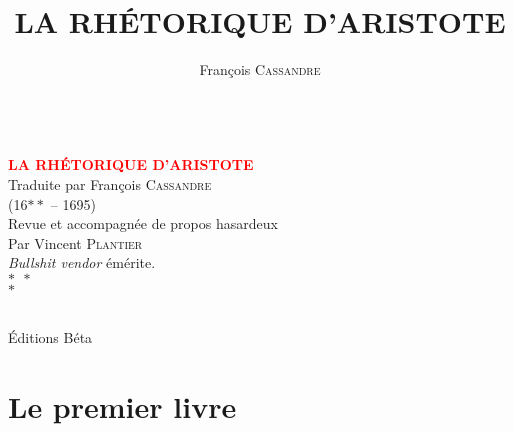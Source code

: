 \documentclass[11pt]{book}
\title{LA RHÉTORIQUE D'ARISTOTE}
\author{François \textsc{Cassandre}}
\begin{document}
\begin{titlepage}

	\centering
	
	~\\[\baselineskip] 

	\textcolor{Red}{\textbf{\Huge LA RHÉTORIQUE D'ARISTOTE}}\\[1.6\baselineskip] 
	
	{\LARGE Traduite par François \textsc{Cassandre}}\\{\small(16$**$ -- 1695)}\\[2.6\baselineskip]
	
	Revue et accompagnée de propos hasardeux\\[0.6\baselineskip] 
	
	\Large Par Vincent P\textsc{lantier}\\[0.6\baselineskip]
	
	{	\footnotesize \emph{Bullshit vendor} émérite.\\$*~~*$\\$*$\\
	}

	\vfill 
	
	\\[0.5\baselineskip]
	
	Éditions Béta

\end{titlepage}


\renewcommand{\headrulewidth}{0pt}




\part{Le premier livre}

\renewcommand{\headrulewidth}{1pt}













\end{document}
